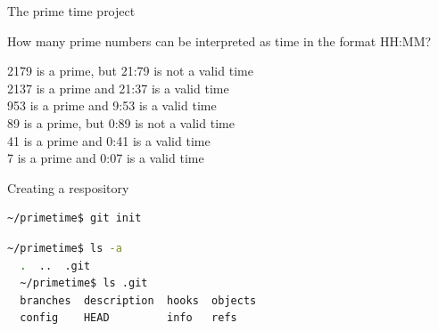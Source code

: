 \documentclass[svgnames]{beamer}
\begin{document}
\begin{frame}{The prime time project}
 \textit{}

 How many prime numbers can be interpreted as time in the format HH:MM?

 \vspace{1\baselineskip}
 \textit{}

 \textcolor{wrong}{2179 is a prime, but 21:79 is not a valid time}\\
 \textcolor{right}{2137 is a prime and 21:37 is a valid time}\\
 \textcolor{right}{953 is a prime and 9:53 is a valid time}\\
 \textcolor{wrong}{89 is a prime, but 0:89 is not a valid time}\\
 \textcolor{right}{41 is a prime and 0:41 is a valid time}\\
 \textcolor{right}{7 is a prime and 0:07 is a valid time}

 \vspace{1.5\baselineskip}
 \begin{center}
 \end{center}
\end{frame}

\begin{frame}[fragile]{Creating a respository}

 \begin{lstlisting}[backgroundcolor=\color{black!10}, language=bash]
  ~/primetime$ git init
 \end{lstlisting}

 \vspace{\baselineskip}
 \begin{lstlisting}[backgroundcolor=\color{black!10}, language=bash]
  ~/primetime$ ls -a
  .  ..  .git
  ~/primetime$ ls .git
  branches  description  hooks  objects
  config    HEAD         info   refs
 \end{lstlisting}

 \begin{center}
 \end{center}
\end{frame}
\end{document}
